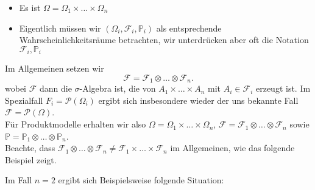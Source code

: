 \begin{remark}
    \begin{itemize}
        \item Es ist $\Omega = \Omega_1\times \ldots\times \Omega_n$
        \item Eigentlich müssen wir $(\Omega_i, \mathcal{F}_i, \mathbb{P}_i)$ als entsprechende Wahrscheinlichkeitsräume betrachten, wir unterdrücken aber oft die Notation $\mathcal{F}_i, \mathbb{P}_i$
    \end{itemize}
Im Allgemeinen setzen wir 
\[
\mathcal{F} = \mathcal{F}_1 \otimes \ldots\otimes \mathcal{F}_n
.\] 
wobei $\mathcal{F}$ dann die $\sigma$-Algebra ist, die von  $A_1\times \ldots\times A_n$ mit $A_i \in \mathcal{F}_i$ erzeugt ist. Im Spezialfall $F_i = \mathcal{P}(\Omega_i)$ ergibt sich insbesondere wieder der uns bekannte Fall $\mathcal{F} = \mathcal{P}(\Omega)$. \\
Für Produktmodelle erhalten wir also $\Omega = \Omega_1\times \ldots\times \Omega_n$, $\mathcal{F} = \mathcal{F}_1 \otimes  \ldots \otimes  \mathcal{F}_n$ sowie $\mathbb{P} = \mathbb{P}_1 \otimes  \ldots \otimes  \mathbb{P}_n$. \\
Beachte, dass $\mathcal{F}_1 \otimes  \ldots \otimes  \mathcal{F}_n \neq  \mathcal{F}_1 \times  \ldots \times  \mathcal{F}_n$ im Allgemeinen, wie das folgende Beispiel zeigt.
\end{remark}
\begin{example}
    Im Fall $n=2$ ergibt sich Beispielsweise folgende Situation:
\end{example}


